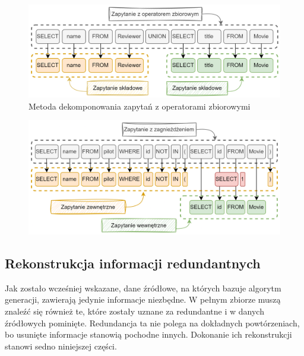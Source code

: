 \begin{figure}[ht!]
  \centering
  \includegraphics[width=1.0\linewidth]{images/query_decomposition_serial.png}
  \caption{Metoda dekomponowania zapytań z operatorami zbiorowymi}
  \label{fig:query-decomposition-serial}
\end{figure}

\begin{figure}[ht!]
  \centering
  \includegraphics[width=1.0\linewidth]{images/query_decomposition_nested.png}
  \label{fig:query-decomposition-nested}
\end{figure}

\subsection{Rekonstrukcja informacji redundantnych}
Jak zostało wcześniej wskazane, dane źródłowe, na których bazuje algorytm generacji, zawierają jedynie informacje niezbędne. W pełnym zbiorze muszą znaleźć się również te, które zostały uznane za redundantne i w danych źródłowych pominięte. Redundancja ta nie polega na dokładnych powtórzeniach, bo usunięte informacje stanowią pochodne innych. Dokonanie ich rekonstrukcji stanowi sedno niniejszej części.

